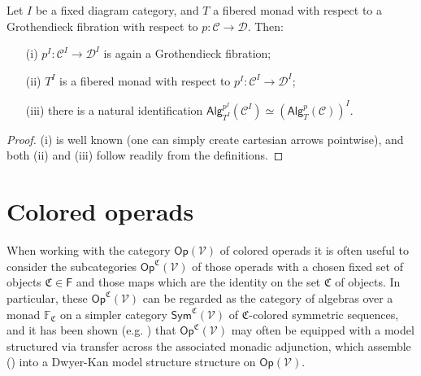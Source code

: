\documentclass[a4paper,10pt
,draft
]{article}%
\renewcommand{\1}{\eta}%
\begin{document}
\begin{proposition}
      \label{DIAGRAMFM_PROP}
Let $I$ be a fixed diagram category, and $T$ a fibered monad with respect to a Grothendieck fibration with respect to
$p\colon \mathcal{C} \to \mathcal{D}$. Then:
\begin{itemize}
\item[(i)] $p^I\colon \mathcal{C}^I \to \mathcal{D}^I$ is again a Grothendieck fibration;
\item[(ii)] $T^I$ is a fibered monad with respect to $p^I\colon \mathcal{C}^I \to \mathcal{D}^I$;
\item[(iii)] there is a natural identification 
$\mathsf{Alg}_{T^I}^{p^I}(\mathcal{C}^I)\simeq
\left(\mathsf{Alg}_T^p(\mathcal{C})\right)^I$.
\end{itemize}
\end{proposition}

\begin{proof}
(i) is well known (one can simply create cartesian arrows pointwise), and both (ii) and (iii) follow readily from the definitions.
\end{proof}








\section{Colored operads}


When working with the category $\mathsf{Op}(\mathcal{V})$ of colored operads
it is often useful to consider the subcategories $\mathsf{Op}^{\mathfrak{C}}(\mathcal{V})$
of those operads with a chosen fixed set of objects
$\mathfrak{C} \in \mathsf{F}$ and those maps which are the identity on the set $\mathfrak{C}$ of objects.
In particular, these $\mathsf{Op}^{\mathfrak{C}}(\mathcal{V})$ can be regarded as the category of algebras over a monad 
$\mathbb{F}_{\mathfrak{C}}$ on a simpler category
$\mathsf{Sym}^{\mathfrak{C}}(\mathcal{V})$ of $\mathfrak C$-colored symmetric sequences,
and it has been shown (e.g. \cite{BM07,BB17,WY18,Cav}) that
$\mathsf{Op}^{\mathfrak{C}}(\mathcal{V})$ may often be equipped with a model structured via transfer across the associated monadic adjunction,
which assemble (\cite{BM13,Cav}) into a Dwyer-Kan model structure structure on $\mathsf{Op}(\mathcal{V})$.

\end{document}
